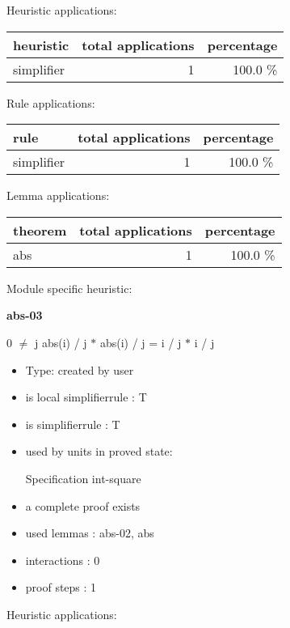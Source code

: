 \documentclass[a4paper]{article}
\begin{document}
Heuristic applications:

\begin{supertabular}{l|r|r}
heuristic	& total applications & percentage \\ \hline
simplifier & 1 & 100.0 \% \\

\end{supertabular}

Rule applications:

\begin{supertabular}{l|r|r}
rule	        & total applications & percentage \\ \hline
simplifier & 1 & 100.0 \% \\

\end{supertabular}

Lemma applications:

\begin{supertabular}{l|r|r}
theorem	        & total applications & percentage \\ \hline
abs & 1 & 100.0 \% \\

\end{supertabular}

Module specific heuristic:

\pagebreak

{\LARGE\bf abs-03}\label{lemma-abs-03}

\medskip

0 $\neq$ j \Fol abs(i) / j $*$ abs(i) / j = i / j $*$ i / j

\begin{itemize}

\item Type: created by user

\item is local simplifierrule : T
\item is simplifierrule : T
\item used by units in proved state:

Specification int-square
\item       a complete proof exists
\item       used lemmas  : abs-02, abs
\item       interactions : 0
\item       proof steps  : 1
\end{itemize}

\medskip


Heuristic applications:
\end{document}
